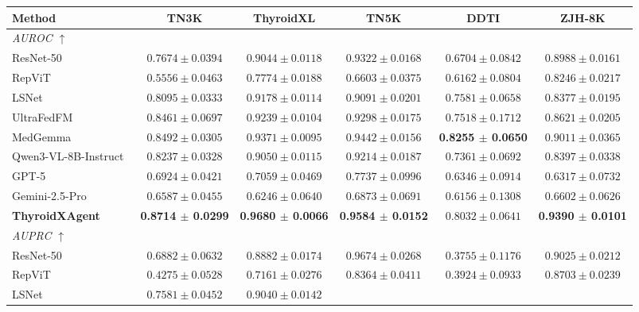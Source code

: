 \documentclass[fleqn,10pt]{wlscirep}
\begin{document}
\begin{appendices}
\begin{table}[p]
\begin{threeparttable}
\begin{tabular}{lccccc}
\toprule
\textbf{Method}
& \textbf{TN3K}
& \textbf{ThyroidXL}
& \textbf{TN5K}
& \textbf{DDTI}
& \textbf{ZJH-8K} \\
\midrule
\multicolumn{6}{l}{\textit{AUROC $\uparrow$}} \\
\midrule
ResNet-50~\cite{he2016deep}
& $0.7674 \pm 0.0394$
& $0.9044 \pm 0.0118$
& $0.9322 \pm 0.0168$
& $0.6704 \pm 0.0842$
& $0.8988 \pm 0.0161$ \\
RepViT~\cite{wang2023repvit}
& $0.5556 \pm 0.0463$
& $0.7774 \pm 0.0188$
& $0.6603 \pm 0.0375$
& $0.6162 \pm 0.0804$
& $0.8246 \pm 0.0217$ \\
LSNet~\cite{wang2025lsnet}
& $0.8095 \pm 0.0333$
& $0.9178 \pm 0.0114$
& $0.9091 \pm 0.0201$
& $0.7581 \pm 0.0658$
& $0.8377 \pm 0.0195$ \\
UltraFedFM~\cite{jiang2025pretraining}
& $0.8461 \pm 0.0697$
& $0.9239 \pm 0.0104$
& $0.9298 \pm 0.0175$
& $0.7518 \pm 0.1712$
& $0.8621 \pm 0.0205$ \\
MedGemma~\cite{sellergren2025medgemma}
& $0.8492 \pm 0.0305$
& $0.9371 \pm 0.0095$
& $0.9442 \pm 0.0156$
& \textbf{0.8255 $\pm$ 0.0650}
& $0.9011 \pm 0.0365$ \\
Qwen3-VL-8B-Instruct~\cite{bai2025qwen3}
& $0.8237 \pm 0.0328$
& $0.9050 \pm 0.0115$
& $0.9214 \pm 0.0187$
& $0.7361 \pm 0.0692$
& $0.8397 \pm 0.0338$ \\
GPT-5~\cite{openai2025gpt5systemcard}
& $0.6924 \pm 0.0421$
& $0.7059 \pm 0.0469$
& $0.7737 \pm 0.0996$
& $0.6346 \pm 0.0914$
& $0.6317 \pm 0.0732$ \\
Gemini-2.5-Pro~\cite{comanici_gemini_2025}
& $0.6587 \pm 0.0455$
& $0.6246 \pm 0.0640$
& $0.6873 \pm 0.0691$
& $0.6156 \pm 0.1308$
& $0.6602 \pm 0.0626$ \\
\rowcolor{lightgray}
\textbf{ThyroidXAgent}
& \textbf{0.8714 $\pm$ 0.0299}
& \textbf{0.9680 $\pm$ 0.0066}
& \textbf{0.9584 $\pm$ 0.0152}
& $0.8032 \pm 0.0641$
& \textbf{0.9390 $\pm$ 0.0101} \\
\midrule
\multicolumn{6}{l}{\textit{AUPRC $\uparrow$}} \\
\midrule
ResNet-50~\cite{he2016deep}
& $0.6882 \pm 0.0632$
& $0.8882 \pm 0.0174$
& $0.9674 \pm 0.0268$
& $0.3755 \pm 0.1176$
& $0.9025 \pm 0.0212$ \\
RepViT~\cite{wang2023repvit}
& $0.4275 \pm 0.0528$
& $0.7161 \pm 0.0276$
& $0.8364 \pm 0.0411$
& $0.3924 \pm 0.0933$
& $0.8703 \pm 0.0239$ \\
LSNet~\cite{wang2025lsnet}
& $0.7581 \pm 0.0452$
& $0.9040 \pm 0.0142$

\end{tabular}
\end{threeparttable}
\end{table}
\end{appendices}
\end{document}
